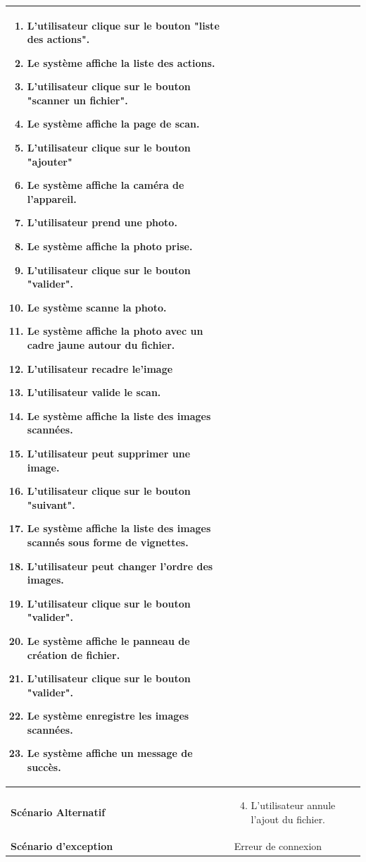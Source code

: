 \begin{longtable}{|p{5cm}|p{10cm}|}
\begin{enumerate}
    \item L'utilisateur clique sur le bouton "liste des actions".
    \item Le système affiche la liste des actions.
    \item L'utilisateur clique sur le bouton "scanner un fichier".
    \item Le système affiche la page de scan.
    \item L'utilisateur clique sur le bouton "ajouter"
    \item Le système affiche la caméra de l'appareil.
    \item L'utilisateur prend une photo.
    \item Le système affiche la photo prise.
    \item L'utilisateur clique sur le bouton "valider".
    \item Le système scanne la photo.
    \item Le système affiche la photo avec un cadre jaune autour du fichier.
    \item L'utilisateur recadre le'image
    \item L'utilisateur valide le scan.
    \item Le système affiche la liste des images scannées.
    \item L'utilisateur peut supprimer une image.
    \item L'utilisateur clique sur le bouton "suivant".
    \item Le système affiche la liste des images scannés sous forme de vignettes.
    \item L'utilisateur peut changer l'ordre des images.
    \item L'utilisateur clique sur le bouton "valider".
    \item Le système affiche le panneau de création de fichier.
    \item L'utilisateur clique sur le bouton "valider".
    \item Le système enregistre les images scannées.
    \item Le système affiche un message de succès.
\end{enumerate}\\
\hline
\textbf{Scénario Alternatif}&
\vspace{-\baselineskip}
\begin{enumerate}
    \setcounter{enumi}{3}
    \item L'utilisateur annule l'ajout du fichier.
\end{enumerate}\\
\hline
\textbf{Scénario d'exception}&Erreur de connexion\\
\hline

\end{longtable}


